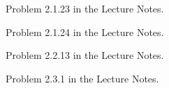 
\begin{Sheet}
  \label{sheet3}
  
  \begin{Problem}
    Problem 2.1.23 in the Lecture Notes.
  \end{Problem}

  \begin{Problem}
  	Problem 2.1.24 in the Lecture Notes.
  \end{Problem}

  \begin{Problem}
  	Problem 2.2.13 in the Lecture Notes.
  \end{Problem}

  \begin{Problem}
  	Problem 2.3.1 in the Lecture Notes.
  \end{Problem}

\end{Sheet}


